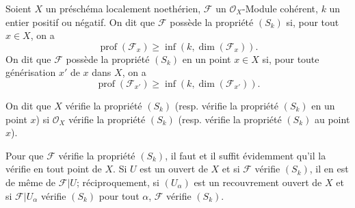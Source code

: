 \begin{definition}[5.7.2]
\label{IV.2.s5.7.2-fr}
Soient $X$ un préschéma localement noethérien, $\mathscr F$ un
$\mathcal O_X$-Module cohérent, $k$ un entier positif ou négatif. On dit que
$\mathscr F$ possède la propriété $(S_k)$ si, pour tout $x\in X$, on a
\begin{equation}
\operatorname{prof}(\mathscr F_x)\geq
\inf(k,\dim(\mathscr F_x)).
\tag{5.7.2.1}\label{IV.2.s5.7.2.1-fr}
\end{equation}
On dit que $\mathscr F$ possède la propriété $(S_k)$ en un point $x\in X$
si, pour toute générisation $x'$ de $x$ dans $X$, on a
\begin{equation}
\operatorname{prof}(\mathscr F_{x'})\geq
\inf(k,\dim(\mathscr F_{x'})).
\tag{5.7.2.2}\label{IV.2.s5.7.2.2-fr}
\end{equation}

On dit que $X$ vérifie la propriété $(S_k)$ (resp. vérifie la propriété
$(S_k)$ en un point $x$) si $\mathcal O_X$ vérifie la propriété $(S_k)$
(resp. vérifie la propriété $(S_k)$ au point $x$).

Pour que $\mathscr F$ vérifie la propriété $(S_k)$, il faut et il suffit
évidemment qu'il la vérifie en tout point de $X$. Si $U$ est un ouvert de
$X$ et si $\mathscr F$ vérifie $(S_k)$, il en est de même de
$\mathscr F|U$; réciproquement, si $(U_\alpha)$ est un recouvrement ouvert
de $X$ et si $\mathscr F|U_\alpha$ vérifie $(S_k)$ pour tout $\alpha$,
$\mathscr F$ vérifie $(S_k)$.
\end{definition}

